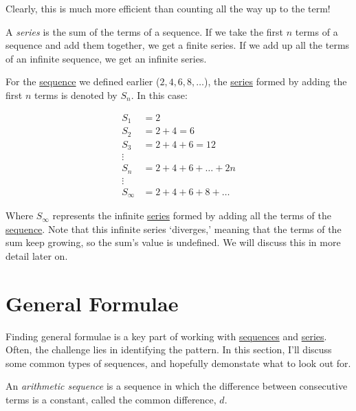 Clearly, this is much more efficient than counting all the way up to the  term!

\begin{definition}[Series]\label{def:series}
  A \textit{series} is the sum of the terms of a sequence. If we take the first $n$ terms of a sequence
  and add them together, we get a finite series. If we add up all the terms of an infinite sequence,
  we get an infinite series.
\end{definition}

For the \hyperref[def:sequence]{sequence} we defined earlier ($2, 4, 6, 8, \ldots$), the \hyperref[def:series]{series} formed by adding the
first $n$ terms is denoted by $S_n$. In this case:

\begin{align*}
  S_1 &= 2 \\
  S_2 &= 2 + 4 = 6 \\
  S_3 &= 2 + 4 + 6 = 12 \\
  \vdots \\
  S_n &= 2 + 4 + 6 + \ldots + 2n \\
  \vdots \\
  S_\infty &= 2 + 4 + 6 + 8 + \ldots
\end{align*}

Where $S_\infty$ represents the infinite \hyperref[def:series]{series} formed by adding all the terms of the \hyperref[def:sequence]{sequence}. Note that
this infinite series `diverges,' meaning that the terms of the sum keep growing, so the sum's value is undefined.
We will discuss this in more detail later on.

\section{General Formulae}

Finding general formulae is a key part of working with \hyperref[def:sequence]{sequences} and \hyperref[def:series]{series}. Often,
the challenge lies in identifying the pattern. In this section,
I'll discuss some common types of sequences, and hopefully demonstate what to look out for.

\begin{definition}\label{def:arithmetic_sequence}
  An \textit{arithmetic sequence} is a sequence in which the difference between consecutive terms is a constant, called the common difference, $d$.
\end{definition}

